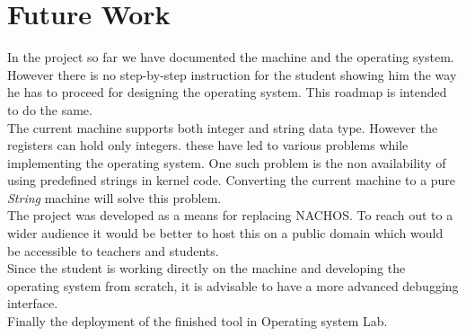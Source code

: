 \chapter{Future Work}
\label{futurework}

In the project so far we have documented the machine and the operating system. However there is no step-by-step instruction for the student showing him the way he has to proceed for designing the operating system. This roadmap is intended to do the same.\\

The current machine supports both integer and string data type. However the registers can hold only integers. these have led to various problems while implementing the operating system. One such problem is the non availability of using predefined strings in kernel code. Converting the current machine to a pure \emph{String} machine will solve this problem.\\

The project was developed as a means for replacing NACHOS. To reach out to a wider audience it would be better to host this on a public domain which would be accessible to teachers and students.\\

Since the student is working directly on the machine and developing the operating system from scratch, it is advisable to have a more advanced debugging interface.\\

Finally the deployment of the finished tool in Operating system Lab.
